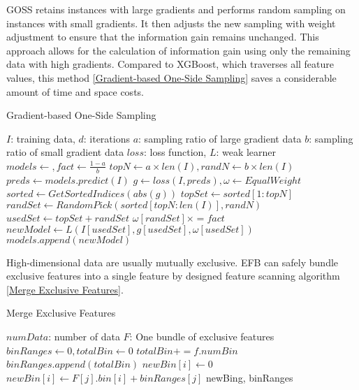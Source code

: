 \documentclass[10pt,letterpaper]{article}
\begin{document}
GOSS retains instances with large gradients and performs random sampling on instances with small gradients. It then adjusts the new sampling with weight adjustment to ensure that the information gain remains unchanged. This approach allows for the calculation of information gain using only the remaining data with high gradients. Compared to XGBoost, which traverses all feature values, this method \ref{Gradient-based One-Side Sampling} saves a considerable amount of time and space costs.
\begin{algorithm}
	\renewcommand{\algorithmicrequire}{\textbf{Input:}}
	\renewcommand{\algorithmicensure}{\textbf{Output:}}
	\caption{Gradient-based One-Side Sampling}
	\label{Gradient-based One-Side Sampling}
	\begin{algorithmic}
        \REQUIRE $I$: training data, $d$: iterations
        \REQUIRE $a$: sampling ratio of large gradient data
        \REQUIRE $b$: sampling ratio of small gradient data
        \REQUIRE $loss$: loss function, $L$: weak learner
        \STATE $models \gets {}, fact \gets \frac{1-a}{b}$
        \STATE $topN \gets a{\times}len(I), randN \gets b{\times}len(I)$
        \STATE $preds \gets models.predict(I)$
        \STATE $g \gets loss(I, preds), \omega \gets EqualWeight$
        \STATE $sorted \gets GetSortedIndices(abs(g))$
        \STATE $topSet \gets sorted[1:topN]$
        \STATE $randSet \gets RandomPick(sorted[topN:len(I)], randN)$
        \STATE $usedSet \gets topSet + randSet$
        \STATE $\omega[randSet] \times= fact$
        \STATE $newModel \gets L(I[usedSet], g[usedSet], \omega[usedSet])$
        \STATE $models.append(newModel)$
        \ENDFOR
	\end{algorithmic}
\end{algorithm}
High-dimensional data are usually mutually exclusive. EFB can safely bundle exclusive features into a single feature by designed feature scanning algorithm \ref{Merge Exclusive Features}.
\begin{algorithm}
	\renewcommand{\algorithmicrequire}{\textbf{Input:}}
	\renewcommand{\algorithmicensure}{\textbf{Output:}}
	\caption{Merge Exclusive Features}
	\label{Merge Exclusive Features}
	\begin{algorithmic}
        \REQUIRE $numData$: number of data
        \REQUIRE $F$: One bundle of exclusive features
        \STATE $binRanges \gets {0}, totalBin \gets 0$
        \STATE $totalBin += f.numBin$
        \STATE $binRanges.append(totalBin)$
        \ENDFOR
        \STATE $newBin[i] \gets 0$
        \STATE $newBin[i] \gets F[j].bin[i] + binRanges[j]$
        \ENDIF
        \ENDFOR
        \ENDFOR
        \ENSURE newBing, binRanges
	\end{algorithmic}
\end{algorithm}
\end{document}
